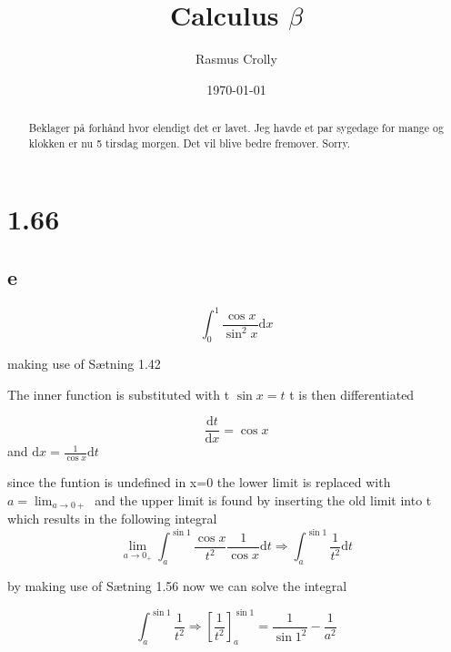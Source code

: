\documentclass[12pt,a4paper]{article}
\title{Calculus $\beta$}
\author{Rasmus Crolly}
\date{\today}
\begin{document}
\maketitle

\begin{abstract}
Beklager på forhånd hvor elendigt det er lavet. Jeg havde et par sygedage for mange og klokken er nu 5 tirsdag morgen. Det vil blive bedre fremover. Sorry.
\end{abstract}

\section{1.66}

\subsection{e}

\begin{equation} \label{}
\int_{0}^{1}\frac{\cos{x}}{\sin^2x}\mathrm{d}x
\end{equation}

making use of Sætning 1.42

The inner function is substituted with t \begin{math}
\sin {x}=t
\end{math}
t is then differentiated

\begin{equation} \label{}
\frac{\mathrm{d}t}{\mathrm{d}x}=\cos{x}
\end{equation}
and \begin{math}
\mathrm{d}x=\frac{1}{\cos{x}}\mathrm{d}t
\end{math}


since the funtion is undefined in x=0 the lower limit is replaced with \begin{math}
a=\lim_{a\to0+} 
\end{math}
and the upper limit is found by inserting the old limit into t which results in the following integral
\begin{equation} \label{}
\lim_{a\to0_+}\int_{a}^{\sin{1}}\frac{\cos{x}}{t^2}\frac{1}{\cos{x}}\mathrm{d}t\Rightarrow \int_{a}^{\sin{1}}\frac{1}{t^2}\mathrm{d}t
\end{equation}




by making use of Sætning 1.56 now we can solve the integral

\begin{equation} \label{}
\int_{a}^{\sin{1}}\frac{1}{t^2}\Rightarrow \left[\frac{1}{t^2}\right]_{a}^{\sin{1}}=\frac{1}{\sin{1}^2}-\frac{1}{a^2}
\end{equation}
\end{document}
